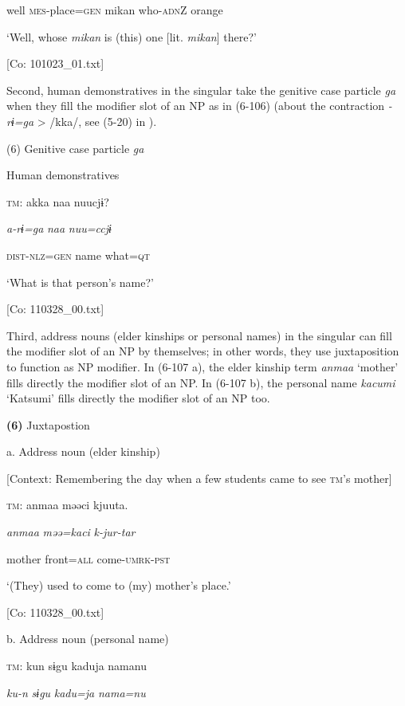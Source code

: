       well  \textsc{mes}-place=\textsc{gen}  mikan  who-\textsc{adn}Z  orange

      ‘Well, whose \textit{mikan} is (this) one [lit. \textit{mikan}] there?’

      [Co: 101023\_01.txt]

  Second, human demonstratives in the singular take the genitive case particle \textit{ga} when they fill the modifier slot of an NP as in (6-106) (about the contraction \textit{{}-rɨ=ga} > /kka/, see (5-20) in ).

(6)  Genitive case particle \textit{ga}

  Human demonstratives

  \textsc{tm}:  akka  naa  nuucjɨ?

    \textit{a-rɨ=ga}  \textit{naa}  \textit{nuu=ccjɨ}

    \textsc{dist}-\textsc{nlz}=\textsc{gen}  name  what=\textsc{qt}

    ‘What is that person’s name?’

    [Co: 110328\_00.txt]

  Third, address nouns (elder kinships or personal names) in the singular can fill the modifier slot of an NP by themselves; in other words, they use juxtaposition to function as NP modifier. In (6-107 a), the elder kinship term \textit{anmaa} ‘mother’ fills directly the modifier slot of an NP. In (6-107 b), the personal name \textit{kacumi} ‘Katsumi’ fills directly the modifier slot of an NP too.

\textbf{(6)}  Juxtapostion

  a.  Address noun (elder kinship)

    [Context: Remembering the day when a few students came to see \textsc{tm}’s mother]

    \textsc{tm}:  anmaa  məəci  kjuuta.

      \textit{anmaa}  \textit{məə=kaci}  \textit{k-jur-tar}

      mother  front=\textsc{all}  come-\textsc{umrk}-\textsc{pst}

      ‘(They) used to come to (my) mother’s place.’

      [Co: 110328\_00.txt]

  b.  Address noun (personal name)

    \textsc{tm}:  kun  sɨgu  kaduja  namanu

      \textit{ku-n}  \textit{sɨgu}  \textit{kadu=ja}  \textit{nama=nu}

